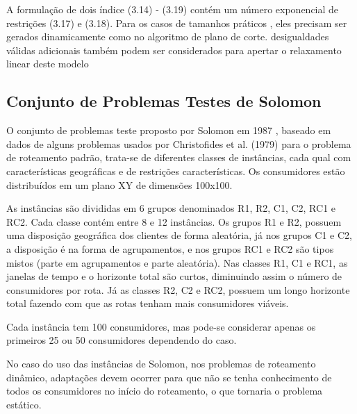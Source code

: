  A formulação de dois índice (3.14) - (3.19) contém um número exponencial de restrições (3.17) e (3.18). Para os casos de tamanhos práticos , eles precisam ser gerados dinamicamente como no algoritmo de plano de corte. desigualdades válidas adicionais também podem ser considerados para apertar o relaxamento linear deste modelo
 


\subsection{Conjunto de Problemas Testes de Solomon}

 O conjunto de problemas teste proposto por Solomon em 1987 \cite{solomon87}, baseado  em  dados  de  alguns  problemas  usados  por  Christofides  et  al.  (1979)  para  o  problema de roteamento padrão, trata-se de diferentes classes de instâncias, cada qual com características   geográficas   e   de   restrições   características.   Os   consumidores   estão   distribuídos em um plano XY de dimensões 100x100.  



As instâncias são divididas em 6 grupos denominados R1, R2, C1, C2, RC1 e RC2. Cada classe contém entre 8 e 12 instâncias. Os grupos R1 e R2, possuem uma disposição geográfica dos clientes de forma aleatória, já nos grupos C1 e C2, a disposição é na forma de  agrupamentos,  e  nos  grupos  RC1  e  RC2  são  tipos  mistos  (parte  em  agrupamentos  e  parte  aleatória).  Nas  classes  R1,  C1  e  RC1,  as  janelas  de  tempo  e  o  horizonte  total  são  curtos, diminuindo assim o número de consumidores por rota. Já as classes R2, C2 e RC2, possuem  um  longo  horizonte  total  fazendo  com  que  as  rotas  tenham  mais  consumidores  viáveis.   


Cada instância tem 100 consumidores, mas pode-se considerar apenas os primeiros 25 ou 50 consumidores dependendo do caso. 



No caso do uso das instâncias de Solomon, nos problemas de roteamento dinâmico, adaptações devem ocorrer para que não se tenha  conhecimento  de  todos  os  consumidores  no início do roteamento, o que tornaria o problema estático.  





